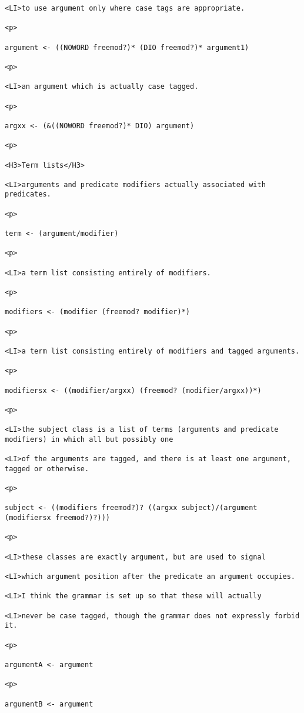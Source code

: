 \documentclass[12pt]{article}
\begin{document}
\begin{lstlisting}
<LI>to use argument only where case tags are appropriate.

<p>

argument <- ((NOWORD freemod?)* (DIO freemod?)* argument1)

<p>

<LI>an argument which is actually case tagged.

<p>

argxx <- (&((NOWORD freemod?)* DIO) argument)

<p>

<H3>Term lists</H3>

<LI>arguments and predicate modifiers actually associated with predicates.

<p>

term <- (argument/modifier)

<p>

<LI>a term list consisting entirely of modifiers.

<p>

modifiers <- (modifier (freemod? modifier)*)

<p>

<LI>a term list consisting entirely of modifiers and tagged arguments.

<p>

modifiersx <- ((modifier/argxx) (freemod? (modifier/argxx))*)

<p>

<LI>the subject class is a list of terms (arguments and predicate modifiers) in which all but possibly one

<LI>of the arguments are tagged, and there is at least one argument, tagged or otherwise.

<p>

subject <- ((modifiers freemod?)? ((argxx subject)/(argument (modifiersx freemod?)?)))

<p>

<LI>these classes are exactly argument, but are used to signal

<LI>which argument position after the predicate an argument occupies.

<LI>I think the grammar is set up so that these will actually

<LI>never be case tagged, though the grammar does not expressly forbid it.

<p>

argumentA <- argument

<p>

argumentB <- argument


\end{lstlisting}
\end{document}
